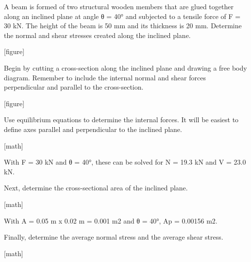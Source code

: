 \documentclass[
  letterpaper,
  DIV=11,
  numbers=noendperiod]{scrreprt}
\begin{document}
\begin{tcolorbox}[enhanced jigsaw, colbacktitle=quarto-callout-note-color!10!white, title={Example 2.5: Inclined plane}, coltitle=black, leftrule=.75mm, rightrule=.15mm, opacityback=0, breakable, colframe=quarto-callout-note-color-frame, left=2mm, arc=.35mm, colback=white, bottomrule=.15mm, bottomtitle=1mm, toptitle=1mm, titlerule=0mm, opacitybacktitle=0.6, toprule=.15mm]

A beam is formed of two structural wooden members that are glued
together along an inclined plane at angle θ = 40° and subjected to a
tensile force of F = 30 kN. The height of the beam is 50 mm and its
thickness is 20 mm. Determine the normal and shear stresses created
along the inclined plane.

{[}figure{]}

\begin{tcolorbox}[enhanced jigsaw, colbacktitle=quarto-callout-note-color!10!white, title={Solution}, coltitle=black, leftrule=.75mm, rightrule=.15mm, opacityback=0, breakable, colframe=quarto-callout-note-color-frame, left=2mm, arc=.35mm, colback=white, bottomrule=.15mm, bottomtitle=1mm, toptitle=1mm, titlerule=0mm, opacitybacktitle=0.6, toprule=.15mm]

Begin by cutting a cross-section along the inclined plane and drawing a
free body diagram. Remember to include the internal normal and shear
forces perpendicular and parallel to the cross-section.

{[}figure{]}

Use equilibrium equations to determine the internal forces. It will be
easiest to define axes parallel and perpendicular to the inclined plane.

{[}math{]}

With F = 30 kN and θ = 40°, these can be solved for N = 19.3 kN and V =
23.0 kN.

Next, determine the cross-sectional area of the inclined plane.

{[}math{]}

With A = 0.05 m x 0.02 m = 0.001 m2 and θ = 40°, Ap = 0.00156 m2.

Finally, determine the average normal stress and the average shear
stress.

{[}math{]}

\end{tcolorbox}

\end{tcolorbox}
\end{document}
